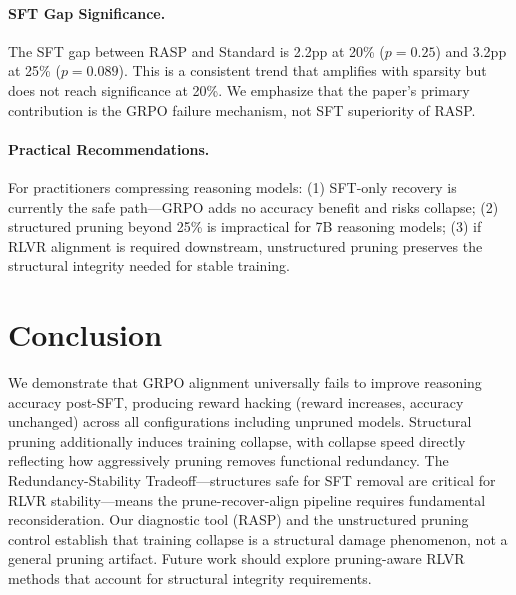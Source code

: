 \documentclass[11pt,a4paper]{article}
\begin{document}
\paragraph{SFT Gap Significance.} The SFT gap between RASP and Standard is 2.2pp at 20\% ($p=0.25$) and 3.2pp at 25\% ($p=0.089$). This is a consistent trend that amplifies with sparsity but does not reach significance at 20\%. We emphasize that the paper's primary contribution is the GRPO failure mechanism, not SFT superiority of RASP.

\paragraph{Practical Recommendations.} For practitioners compressing reasoning models: (1) SFT-only recovery is currently the safe path---GRPO adds no accuracy benefit and risks collapse; (2) structured pruning beyond 25\% is impractical for 7B reasoning models; (3) if RLVR alignment is required downstream, unstructured pruning preserves the structural integrity needed for stable training.

\section{Conclusion}

We demonstrate that GRPO alignment universally fails to improve reasoning accuracy post-SFT, producing reward hacking (reward increases, accuracy unchanged) across all configurations including unpruned models. Structural pruning additionally induces training collapse, with collapse speed directly reflecting how aggressively pruning removes functional redundancy. The Redundancy-Stability Tradeoff---structures safe for SFT removal are critical for RLVR stability---means the prune-recover-align pipeline requires fundamental reconsideration. Our diagnostic tool (RASP) and the unstructured pruning control establish that training collapse is a structural damage phenomenon, not a general pruning artifact. Future work should explore pruning-aware RLVR methods that account for structural integrity requirements.
\end{document}
